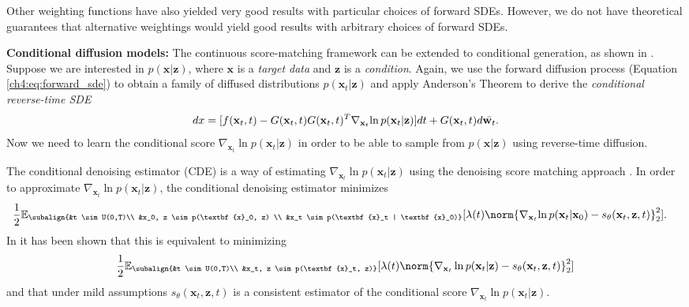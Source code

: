 Other weighting functions have also yielded very good results \cite{kingmaVDM} with particular choices of forward SDEs. However, we do not have theoretical guarantees that alternative weightings would yield good results with arbitrary choices of forward SDEs.


\textbf{Conditional diffusion models:} The continuous score-matching framework can be extended to conditional generation, as shown in  \cite{song2020score}. Suppose we are interested in $p(\textbf{x} | \textbf{z})$, where $\textbf{x}$ is a \textit{target data} and $\textbf{z}$ is a \textit{condition}. Again, we use the forward diffusion process (Equation \ref{ch4:eq:forward_sde}) to obtain a family of diffused distributions $p(\textbf{x}_t | \textbf{z})$ and apply Anderson's Theorem to derive the \textit{conditional reverse-time SDE}
\begin{equation}
\label{ch4:eq:conditional_reverse_sde}
    dx = [f(\textbf{x}_t,t) -G(\textbf{x}_t,t)G(\textbf{x}_t,t)^T\nabla_{\textbf{x}_t}{\ln{p(\textbf{x}_t | \textbf{z})}}]dt + G(\textbf{x}_t,t)d\Bar{\textbf{w}_t}.
\end{equation}
Now we need to learn the conditional score $\nabla_{\textbf{x}_t} \ln{p(\textbf{x}_t | \textbf{z})}$ in order to be able to sample from $p(\textbf{x} | \textbf{z})$ using reverse-time diffusion.

The conditional denoising estimator (CDE) is a way of estimating $\nabla_{\textbf{x}_t} \ln{p(\textbf{x}_t | \textbf{z})}$ using the denoising score matching approach \cite{vincent2011connection, song2020score}. In order to approximate $\nabla_{\textbf{x}_t} \ln{p(\textbf{x}_t | \textbf{z})}$, the conditional denoising estimator minimizes
\begin{gather}
\begin{aligned}
        \label{ch4:CDE}
        &\frac{1}{2} \mathbb{E}_{\subalign{&t \sim U(0,T)\\ &x_0, z \sim p(\textbf{x}_0, z) \\ &x_t \sim p(\textbf{x}_t | \textbf{x}_0)}} 
        [\lambda(t) \norm{\nabla_{\textbf{x}_t}{\ln{p(\textbf{x}_t | \textbf{x}_0)}} -  s_\theta(\textbf{x}_t, \textbf{z},t)}_2^2].
\end{aligned}
\end{gather}
In \cite{batzolis2022non_uniform} it has been shown that this is equivalent to minimizing 
\begin{gather*}
        \frac{1}{2} \mathbb{E}_{\subalign{&t \sim U(0,T)\\ &x_t, z \sim p(\textbf{x}_t, z)}} 
        [\lambda(t) \norm{\nabla_{\textbf{x}_t} \ln{p(\textbf{x}_t | \textbf{z})} - s_\theta(\textbf{x}_t, \textbf{z},t)}_2^2]
\end{gather*}
and that under mild assumptions $ s_\theta(\textbf{x}_t, \textbf{z},t)$ is a consistent estimator of the conditional score $\nabla_{\textbf{x}_t} \ln{p(\textbf{x}_t | \textbf{z})}$.

